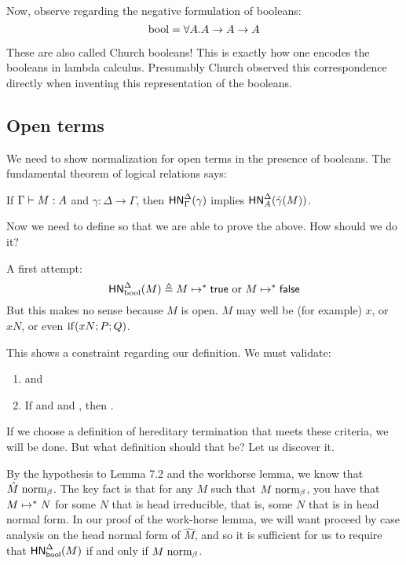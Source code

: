 \documentclass{article}
\begin{document}
Now, observe regarding the negative formulation of booleans:
\[
\text{bool} = \forall A . A \to A \to A
\]

These are also called Church booleans! This is exactly how one encodes the booleans in lambda calculus. Presumably Church observed this correspondence directly when inventing this representation of the booleans.

\subsection{Open terms}
We need to show normalization for open terms in the presence of booleans. The fundamental theorem of logical relations says:
\begin{center}
  If $\Gamma \vdash M : A$ and $\gamma : \Delta \to \Gamma$, then $\mathsf{HN}^{\Delta}_{\Gamma}(\gamma)$ implies $\mathsf{HN}^{\Delta}_{A}(\hat\gamma(M))$.
\end{center}

Now we need to define  so that we are able to prove the above. How should we do it?

A first attempt:
\[
\mathsf{HN}^{\Delta}_{\text{bool}}(M) \triangleq M \mapsto^* \mathsf{true} \ \text{or} \ M \mapsto^* \mathsf{false}
\]
But this makes no sense because $M$ is open. $M$ may well be (for example) $x$, or $x N$, or even $\mathrm{if}(x N; P; Q)$.

This shows a constraint regarding our definition. We must validate:
\begin{lemma}
\leavevmode
\label{hn-bools}
\begin{enumerate}
\item \hnorm{\Delta}{\booltype}{\true} and \hnorm{\Delta}{\booltype}{\false}
\item If  and  and , then .
\end{enumerate}
\end{lemma}

If we choose a definition of hereditary termination that meets these criteria, we will be done. But what definition should that be? Let us discover it.

  By the hypothesis to Lemma 7.2 and the workhorse lemma, we know that
   $\hat M \mathrel{\text{norm}_\beta}$. The key fact is that for any $M$ such that $M \mathrel{\text{norm}_\beta}$,
   you have that $M \mapsto^* N$ for some $N$ that is head irreducible, that is,
   some $N$ that is in head normal form. In our proof of the work-horse lemma,
   we will want proceed by case analysis on the head normal form of $\hat M$,
   and so it is sufficient for us to require that $\mathsf{HN}^{\Delta}_{\mathsf{bool}}(M)$ if
   and only if $M \mathrel{\text{norm}_\beta}$.
\end{document}
